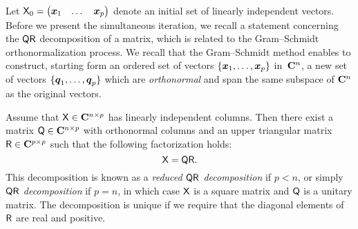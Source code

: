 Let $\mathsf X_0 = \begin{pmatrix} \mathbf{\boldsymbol{x}}_1 & \dotsc & \mathbf{\boldsymbol{x}}_p \end{pmatrix}$ denote an initial set of linearly independent vectors.
Before we present the simultaneous iteration,
we recall a statement concerning the $\mathsf Q \mathsf R$ decomposition of a matrix,
which is related to the Gram--Schmidt orthonormalization process.
We recall that the Gram--Schmidt method enables to construct,
starting form an ordered set of vectors $\{\mathbf{\boldsymbol{x}}_1, \dotsc, \mathbf{\boldsymbol{x}}_p \}$ in~$\mathbf C^n$,
a new set of vectors $\{\mathbf{\boldsymbol{q}}_1, \dotsc, \mathbf{\boldsymbol{q}}_p \}$
which are \emph{orthonormal} and span the same subspace of $\mathbf C^n$ as the original vectors.
\begin{proposition}
    Assume that $\mathsf X \in \mathbf C^{n \times p}$ has linearly independent columns.
    Then there exist a matrix $\mathsf Q \in \mathbf C^{n \times p}$ with orthonormal columns and
    an upper triangular matrix~$\mathsf R \in \mathbf C^{p \times p}$ such that the following factorization holds:
    \begin{equation}
        \label{eq:qr}
        \mathsf X = \mathsf Q \mathsf R.
    \end{equation}
    This decomposition is known as a \emph{reduced $\mathsf Q \mathsf R$ decomposition} if $p < n$,
    or simply \emph{$\mathsf Q \mathsf R$ decomposition} if $p = n$,
    in which case $\mathsf X$ is a square matrix and $\mathsf Q$ is a unitary matrix.
    The decomposition is unique if we require that the diagonal elements of~$\mathsf R$ are real and positive.
\end{proposition}
